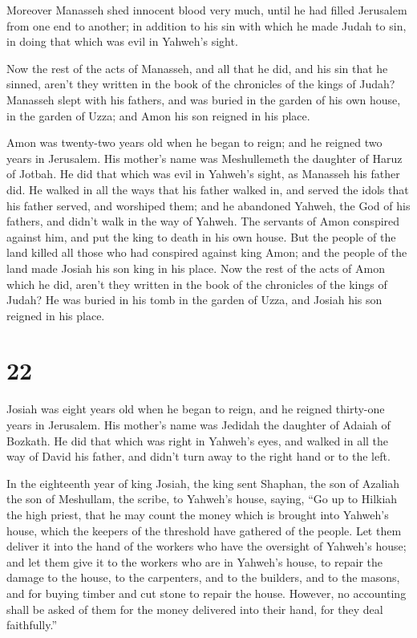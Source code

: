  Moreover Manasseh shed innocent blood very much, until he
had filled Jerusalem from one end to another; in addition to his sin
with which he made Judah to sin, in doing that which was evil in
Yahweh's sight.

 Now the rest of the acts of Manasseh, and all that he did,
and his sin that he sinned, aren't they written in the book of the
chronicles of the kings of Judah?  Manasseh slept with his
fathers, and was buried in the garden of his own house, in the garden of
Uzza; and Amon his son reigned in his place.

 Amon was twenty-two years old when he began to reign; and
he reigned two years in Jerusalem. His mother's name was Meshullemeth
the daughter of Haruz of Jotbah.  He did that which was
evil in Yahweh's sight, as Manasseh his father did.  He
walked in all the ways that his father walked in, and served the idols
that his father served, and worshiped them;  and he
abandoned Yahweh, the God of his fathers, and didn't walk in the way of
Yahweh.  The servants of Amon conspired against him, and
put the king to death in his own house.  But the people of
the land killed all those who had conspired against king Amon; and the
people of the land made Josiah his son king in his place. 
Now the rest of the acts of Amon which he did, aren't they written in
the book of the chronicles of the kings of Judah?  He was
buried in his tomb in the garden of Uzza, and Josiah his son reigned in
his place.

\hypertarget{section-21}{%
\section{22}\label{section-21}}

 Josiah was eight years old when he began to reign, and he
reigned thirty-one years in Jerusalem. His mother's name was Jedidah the
daughter of Adaiah of Bozkath.  He did that which was right
in Yahweh's eyes, and walked in all the way of David his father, and
didn't turn away to the right hand or to the left.

 In the eighteenth year of king Josiah, the king sent
Shaphan, the son of Azaliah the son of Meshullam, the scribe, to
Yahweh's house, saying,  ``Go up to Hilkiah the high priest,
that he may count the money which is brought into Yahweh's house, which
the keepers of the threshold have gathered of the people. 
Let them deliver it into the hand of the workers who have the oversight
of Yahweh's house; and let them give it to the workers who are in
Yahweh's house, to repair the damage to the house,  to the
carpenters, and to the builders, and to the masons, and for buying
timber and cut stone to repair the house.  However, no
accounting shall be asked of them for the money delivered into their
hand, for they deal faithfully.''

